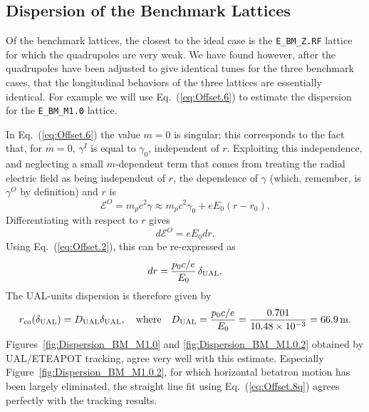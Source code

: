 \documentclass[]{article}
\begin{document}
\subsection{Dispersion of the Benchmark Lattices}
Of the benchmark lattices, the closest to the ideal
case is the {\tt E\_BM\_Z.RF} lattice for which the
quadrupoles are very weak. We have found however,
after the quadrupoles have been adjusted to give
identical tunes for the three benchmark cases, that
the longitudinal behaviors of the three lattices are
essentially identical. For example we 
will use Eq.~(\ref{eq:Offset.6}) 
to estimate the dispersion for the {\tt E\_BM\_M1.0} lattice.

In Eq.~(\ref{eq:Offset.6}) the value $m=0$ is singular; this corresponds to
the fact that, for $m=0$, $\gamma^I$ is equal to $\gamma_0$, 
independent of $r$. Exploiting this independence, and neglecting
a small $m$-dependent term that comes from treating the radial
electric field as being independent of $r$, the dependence of
$\gamma$ (which, remember, is $\gamma^O$ by definition) and $r$ is
%
\begin{equation}
\mathcal{E}^O
 =
 m_pc^2\gamma
 \approx 
m_pc^2\gamma_0 + eE_0(r-r_0).
\label{eq:Offset.7}
\end{equation}
%
Differentiating with respect to $r$ gives
%
\begin{equation}
d\mathcal{E}^O = eE_0dr.
\label{eq:Offset.8}
\end{equation}
%
Using Eq.~(\ref{eq:Offset.2}), this can be re-expressed as  
%
\begin{equation}
dr = \frac{p_0c/e}{E_0}\,\delta_{\rm UAL}.
\label{eq:Offset.8p}
\end{equation}
%
The UAL-units dispersion is therefore given by
%
\begin{equation}
r_{\rm co}(\delta_{\rm UAL})
 =
D_{\rm UAL}\delta_{\rm UAL},
\quad\hbox{where}\quad
D_{\rm UAL}
 = 
\frac{p_0c/e}{E_0}
 = 
\frac{0.701}{10.48\times10^{-3}}
 =
66.9\,{\rm m}.
\label{eq:Offset.8q}
\end{equation}
%
Figures~\ref{fig:Dispersion_BM_M1.0} and \ref{fig:Dispersion_BM_M1.0.2}
obtained by UAL/ETEAPOT tracking, agree very well with this
estimate. Especially Figure~\ref{fig:Dispersion_BM_M1.0.2}, for
which horizontal betatron motion has been largely eliminated,
the straight line fit using Eq.~(\ref{eq:Offset.8q}) agrees
perfectly with the tracking results.
\end{document}
